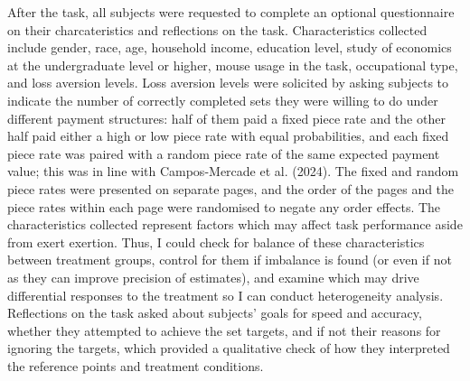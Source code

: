 \documentclass[
  12,
  letterpaper,
  DIV=11,
  numbers=noendperiod]{scrartcl}
\begin{document}
After the task, all subjects were requested to complete an optional
questionnaire on their charcateristics and reflections on the task.
Characteristics collected include gender, race, age, household income,
education level, study of economics at the undergraduate level or
higher, mouse usage in the task, occupational type, and loss aversion
levels. Loss aversion levels were solicited by asking subjects to
indicate the number of correctly completed sets they were willing to do
under different payment structures: half of them paid a fixed piece rate
and the other half paid either a high or low piece rate with equal
probabilities, and each fixed piece rate was paired with a random piece
rate of the same expected payment value; this was in line with
Campos-Mercade et al. (2024). The fixed and random piece rates were
presented on separate pages, and the order of the pages and the piece
rates within each page were randomised to negate any order effects. The
characteristics collected represent factors which may affect task
performance aside from exert exertion. Thus, I could check for balance
of these characteristics between treatment groups, control for them if
imbalance is found (or even if not as they can improve precision of
estimates), and examine which may drive differential responses to the
treatment so I can conduct heterogeneity analysis. Reflections on the
task asked about subjects' goals for speed and accuracy, whether they
attempted to achieve the set targets, and if not their reasons for
ignoring the targets, which provided a qualitative check of how they
interpreted the reference points and treatment conditions.
\end{document}
